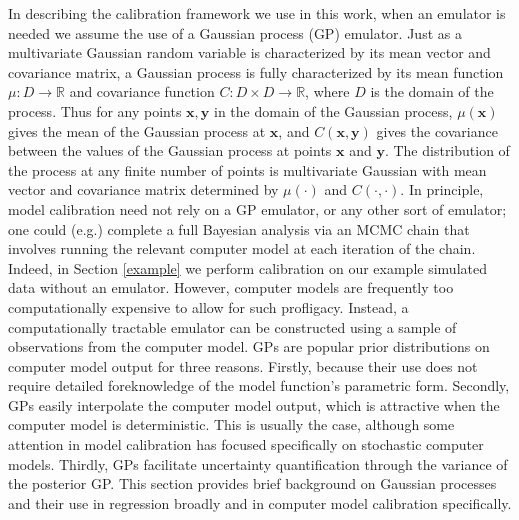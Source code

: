 \documentclass[12pt]{article}
\begin{document}
In describing the calibration framework we use in this work, when an emulator is needed we assume the use of a Gaussian process (GP) emulator.
%
Just as a multivariate Gaussian random variable is characterized by its mean vector and covariance matrix, a Gaussian process is fully characterized by its mean function $\mu:D\to \mathbb R$ and covariance function $C:D\times D\to \mathbb R$, where $D$ is the domain of the process. 
%
Thus for any points $\mathbf x,\mathbf y$ in the domain of the Gaussian process, $\mu(\mathbf x)$ gives the mean of the Gaussian process at $\mathbf x$, and $C(\mathbf x, \mathbf y)$ gives the covariance between the values of the Gaussian process at points $\mathbf x$ and $\mathbf y$.
%
The distribution of the process at any finite number of points is multivariate Gaussian with mean vector and covariance matrix determined by $\mu(\cdot)$ and $C(\cdot,\cdot)$.
%
In principle, model calibration need not rely on a GP emulator, or any other sort of emulator; one could (e.g.) complete a full Bayesian analysis via an MCMC chain that involves running the relevant computer model at each iteration of the chain. 
%
Indeed, in Section \ref{example} we perform calibration on our example simulated data without an emulator.
%
However, computer models are frequently too computationally expensive to allow for such profligacy.
%
Instead, a computationally tractable emulator can be constructed using a sample of observations from the computer model. 
%
GPs are popular prior distributions on computer model output for three reasons.
%
Firstly, because their use does not require detailed foreknowledge of the model function's parametric form. 
%
Secondly, GPs easily interpolate the computer model output, which is attractive when the computer model is deterministic. 
%
This is usually the case, although some attention in model calibration \citep[e.g.][]{Pratola2018} has focused specifically on stochastic computer models. 
%
Thirdly, GPs facilitate uncertainty quantification through the variance of the posterior GP. 
%
This section provides brief background on Gaussian processes and their use in regression broadly and in computer model calibration specifically.
%
\end{document}
